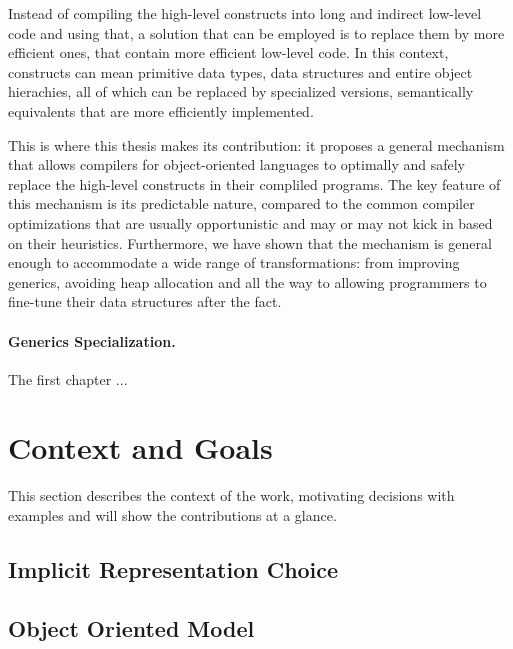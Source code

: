 Instead of compiling the high-level constructs into long and indirect low-level code and using that, a solution that can be employed is to replace them by more efficient ones, that contain more efficient low-level code. In this context, constructs can mean primitive data types, data structures and entire object hierachies, all of which can be replaced by specialized versions, semantically equivalents that are more efficiently implemented.

This is where this thesis makes its contribution: it proposes a general mechanism that allows compilers for object-oriented languages to optimally and safely replace the high-level constructs in their compliled programs. The key feature of this mechanism is its predictable nature, compared to the common compiler optimizations that are usually opportunistic and may or may not kick in based on their heuristics. Furthermore, we have shown that the mechanism is general enough to accommodate a wide range of transformations: from improving generics, avoiding heap allocation and all the way to allowing programmers to fine-tune their data structures after the fact.



\paragraph{Generics Specialization.} The first chapter ...


\cite{st-amour-opt-coaching}

\section{Context and Goals}

This section describes the context of the work, motivating decisions with examples and will show the contributions at a glance.

\subsection{Implicit Representation Choice}


\subsection{Object Oriented Model}


